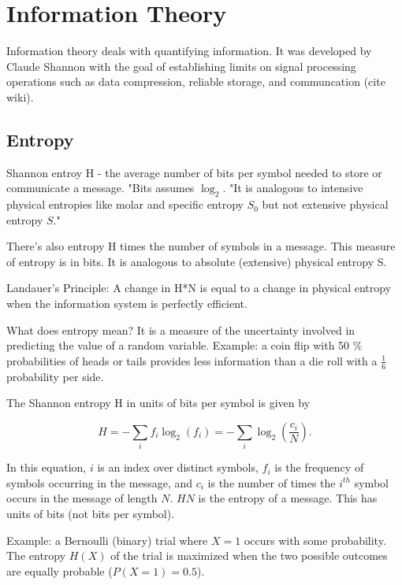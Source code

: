 \section{Information Theory}

Information theory deals with quantifying information. It was developed by Claude Shannon with the goal of establishing limits on signal processing operations such as data compression, reliable storage, and communcation (cite wiki). 

\subsection{Entropy}

Shannon entroy H - the average number of bits per symbol needed to store or communicate a message. "Bits assumes $\log_{2}$. "It is analogous to intensive physical entropies like molar and specific entropy $S_{0}$ but not extensive physical entropy $S$."

There's also entropy H times the number of symbols in a message. This measure of entropy is in bits. It is analogous to absolute (extensive) physical entropy S. 

Landauer's Principle: A change in H*N is equal to a change in physical entropy when the information system is perfectly efficient. 

What does entropy mean? It is a measure of the uncertainty involved in predicting the value of a random variable. Example: a coin flip with 50 \% probabilities of heads or tails provides less information than a die roll with a $\frac{1}{6}$ probability per side. 

The Shannon entropy H in units of bits per symbol is given by

\begin{equation}
H = - \sum_{i} f_{i} \log_{2} (f_{i}) = - \sum_{i} \log_{2} (\frac{c_{i}}{N}).
\end{equation}

In this equation, $i$ is an index over distinct symbols, $f_{i}$ is the frequency of symbols occurring in the message, and $c_{i}$ is the number of times the $i^{th}$ symbol occurs in the message of length $N$. $H N$ is the entropy of a message. This has units of bits (not bits per symbol). 

Example: a Bernoulli (binary) trial where $X=1$ occurs with some probability. The entropy $H(X)$ of the trial is maximized when the two possible outcomes are equally probable ($P(X=1) = 0.5$).

